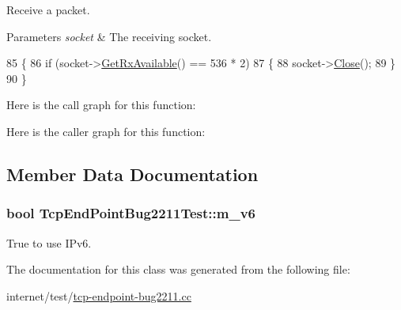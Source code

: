 Receive a packet. 


\begin{DoxyParams}{Parameters}
{\em socket} & The receiving socket. \\
\hline
\end{DoxyParams}

\begin{DoxyCode}
85 \{
86   \textcolor{keywordflow}{if} (socket->\hyperlink{classns3_1_1Socket_ad35d8931e53ae0754ee864acb1cecd0e}{GetRxAvailable}() == 536 * 2)
87     \{
88       socket->\hyperlink{classns3_1_1Socket_abdac6e2498c5aa2963ef361d4200ddf3}{Close}();
89     \}
90 \}
\end{DoxyCode}


Here is the call graph for this function\+:




Here is the caller graph for this function\+:




\subsection{Member Data Documentation}
\subsubsection[{\texorpdfstring{m\+\_\+v6}{m_v6}}]{\setlength{\rightskip}{0pt plus 5cm}bool Tcp\+End\+Point\+Bug2211\+Test\+::m\+\_\+v6\hspace{0.3cm}{\ttfamily [private]}}\hypertarget{classTcpEndPointBug2211Test_a187eb7cee3ee1550d773cab9bd1ccfc4}{}\label{classTcpEndPointBug2211Test_a187eb7cee3ee1550d773cab9bd1ccfc4}


True to use I\+Pv6. 



The documentation for this class was generated from the following file\+:\begin{DoxyCompactItemize}
\item 
internet/test/\hyperlink{tcp-endpoint-bug2211_8cc}{tcp-\/endpoint-\/bug2211.\+cc}\end{DoxyCompactItemize}
